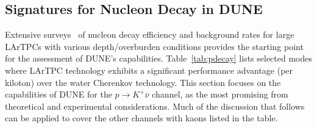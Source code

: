 \subsection{Signatures for Nucleon Decay in DUNE}

Extensive surveys~\cite{Bueno:2007um,klinger} of nucleon decay efficiency 
and background rates for large LArTPCs with various depth/overburden 
conditions provides the starting point for the 
assessment of DUNE's capabilities.  Table~\ref{tab:pdecay} lists selected
modes where LArTPC technology exhibits a significant performance 
advantage (per kiloton) over the water Cherenkov technology.
This section focuses on the capabilities 
of DUNE for the $p\to K^+\overline{\nu}$ channel, as the most 
promising from theoretical and experimental 
considerations.  Much of the discussion that follows can be 
applied to cover the other channels with kaons listed in 
the table.
%
\begin{table}[!htbp]
\caption[Efficiencies and background rates for nucleon decay modes]
        {Efficiencies and background rates (events per \SI{}{\Mtyr}) for nucleon decay 
         channels of interest for a large underground LArTPC~\cite{Bueno:2007um}, and 
         comparison with water Cherenkov detector capabilities.  
         The entries for the water Cherenkov capabilities are based 
         on experience with the \superk{} detector~\cite{kearns_isoups}.  
        }
\begin{center}
\end{center}
\label{tab:pdecay}
\end{table}

